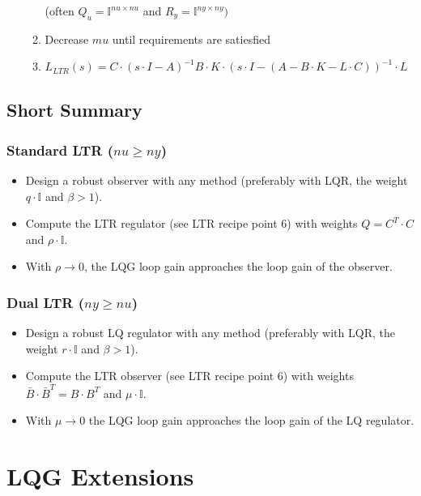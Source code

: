 \documentclass[10pt,a4paper]{scrartcl}
\begin{document}
\begin{multicols*}{3}
\begin{enumerate}
\begin{enumerate}[leftmargin=*]
	(often $Q_u=\mathbb{I}^{nu\times nu}$ and $R_y=\mathbb{I}^{ny\times ny})$
	\item
	Decrease $mu$ until requirements are satiesfied
	\item
	$L_{LTR}(s)=C\cdot(s\cdot I-A)^{-1}B\cdot K\cdot (s\cdot I-(A-B\cdot K-L\cdot C))^{-1}\cdot L$
	\end{enumerate}
	\end{enumerate}
	
	\subsection*{Short Summary}
	
	\subsubsection*{Standard LTR ($nu\geq ny$)}
	
	\begin{itemize}	
	\compaq
	\item
	Design a robust observer with any method (preferably with LQR, the weight $q\cdot\mathbb{I}$ and $\beta>1$).
	\item
	Compute the LTR regulator (see LTR recipe point 6) with weights $Q=C^T\cdot C$ and $\rho\cdot \mathbb{I}$.
	\item
	With $\rho\rightarrow 0$, the LQG loop gain approaches the loop gain of the observer.
	\end{itemize}
	
	\subsubsection*{Dual LTR ($ny\geq nu$)}
	
	\begin{itemize}
	\compaq
	\item
	Design a robust LQ regulator with any method (preferably with LQR, the weight $r\cdot\mathbb{I}$ and $\beta>1$).
	\item
	Compute the LTR observer (see LTR recipe point 6) with weights $\bar{B}\cdot\bar{B}^T=B\cdot B^T$ and $\mu\cdot\mathbb{I}$.
	\item
	With $\mu\rightarrow 0$ the LQG loop gain approaches the loop gain of the LQ regulator.
	\end{itemize}	
	
	\section{LQG Extensions}
	

\end{multicols*}
\end{document}
